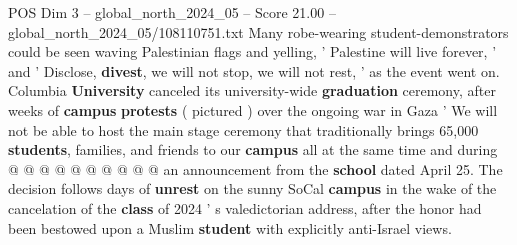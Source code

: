 \begin{textsample}{POS Dim 3 – global\_north\_2024\_05 – Score 21.00 – global\_north\_2024\_05/108110751.txt}
Many robe-wearing student-demonstrators could be seen waving Palestinian flags and yelling, ' Palestine will live forever, ' and ' Disclose, \textbf{divest}, we will not stop, we will not rest, ' as the event went on.
Columbia \textbf{University} canceled its university-wide \textbf{graduation} ceremony, after weeks of \textbf{campus} \textbf{protests} ( pictured ) over the ongoing war in Gaza ' We will not be able to host the main stage ceremony that traditionally brings 65,000 \textbf{students}, families, and friends to our \textbf{campus} all at the same time and during @ @ @ @ @ @ @ @ @ @ an announcement from the \textbf{school} dated April 25.
The decision follows days of \textbf{unrest} on the sunny SoCal \textbf{campus} in the wake of the cancelation of the \textbf{class} of 2024 ' s valedictorian address, after the honor had been bestowed upon a Muslim \textbf{student} with explicitly anti-Israel views.

\end{textsample}
